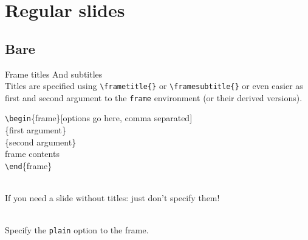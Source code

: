 \documentclass[aspectratio=1610]{beamer}
\newcommand*\command[1]{{\tt \textbackslash #1}}
\newcommand*\ind[1][2ex]{\hspace*{#1}}
\newcommand*\bframe[1][]{\command{begin}\{#1frame\}}
\newcommand*\eframe[1][]{\command{end}\{#1frame\}}
\begin{document}
\section{Regular slides}

\subsection{Bare}

\begin{frame}[negative]
  \sectionpage
\end{frame}

\begin{frame}[negative]
  \subsectionpage
\end{frame}

\begin{frame}[t]
  {Frame titles}
  {And subtitles}
  \\
  Titles are specified using \command{frametitle\{\}} or
  \command{framesubtitle\{\}} or even easier as first and second argument
  to the \texttt{frame} environment (or their derived versions).

  \begin{codesnippet}
    \bframe[][options go here, comma separated]\\
    \ind\{first argument\}\\
    \ind\{second argument\}\\
    \ind frame contents \\
    \eframe
  \end{codesnippet}
  \bigskip

  \\
  If you need a slide without titles: just don't specify them!

  \\
  Specify the \texttt{plain} option to the frame.

\end{frame}
\end{document}
